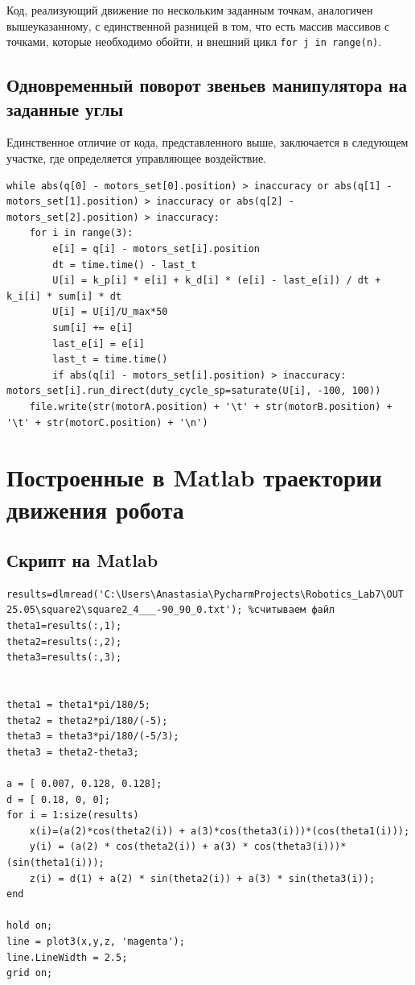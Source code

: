 \documentclass{article}
\begin{document}
\par Код, реализующий движение по нескольким заданным точкам, аналогичен вышеуказанному, с единственной разницей в том, что есть массив массивов с точками, которые необходимо обойти, и внешний цикл \texttt{for j in range(n)}.

\subsection{Одновременный поворот звеньев манипулятора на заданные углы}
\par Единственное отличие от кода, представленного выше, заключается в следующем участке, где определяется управляющее воздействие.
\begin{verbatim}
while abs(q[0] - motors_set[0].position) > inaccuracy or abs(q[1] - motors_set[1].position) > inaccuracy or abs(q[2] - motors_set[2].position) > inaccuracy:
    for i in range(3):
        e[i] = q[i] - motors_set[i].position
        dt = time.time() - last_t
        U[i] = k_p[i] * e[i] + k_d[i] * (e[i] - last_e[i]) / dt + k_i[i] * sum[i] * dt
        U[i] = U[i]/U_max*50
        sum[i] += e[i]
        last_e[i] = e[i]
        last_t = time.time()
        if abs(q[i] - motors_set[i].position) > inaccuracy: motors_set[i].run_direct(duty_cycle_sp=saturate(U[i], -100, 100))
    file.write(str(motorA.position) + '\t' + str(motorB.position) + '\t' + str(motorC.position) + '\n')
\end{verbatim}



\section{Построенные в Matlab траектории движения робота}
\subsection{Скрипт на Matlab}
\begin{verbatim}
results=dlmread('C:\Users\Anastasia\PycharmProjects\Robotics_Lab7\OUT 25.05\square2\square2_4___-90_90_0.txt'); %считываем файл
theta1=results(:,1);
theta2=results(:,2);
theta3=results(:,3);


theta1 = theta1*pi/180/5;
theta2 = theta2*pi/180/(-5);
theta3 = theta3*pi/180/(-5/3);
theta3 = theta2-theta3;

a = [ 0.007, 0.128, 0.128];
d = [ 0.18, 0, 0];
for i = 1:size(results)
    x(i)=(a(2)*cos(theta2(i)) + a(3)*cos(theta3(i)))*(cos(theta1(i)));
    y(i) = (a(2) * cos(theta2(i)) + a(3) * cos(theta3(i)))*(sin(theta1(i)));
    z(i) = d(1) + a(2) * sin(theta2(i)) + a(3) * sin(theta3(i));
end 

hold on; 
line = plot3(x,y,z, 'magenta');
line.LineWidth = 2.5;
grid on;

\end{verbatim}
\end{document}
